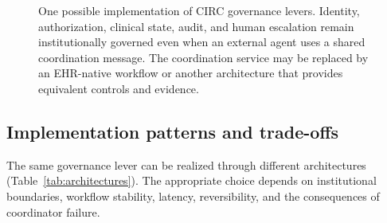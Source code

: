 \documentclass[10pt]{article}
\begin{document}
\begin{figure}[htbp]
\centering
\resizebox{0.98\linewidth}{!}{}
\caption{One possible implementation of CIRC governance levers. Identity, authorization, clinical
state, audit, and human escalation remain institutionally governed even when an external agent uses a
shared coordination message. The coordination service may be replaced by an EHR-native workflow or
another architecture that provides equivalent controls and evidence.}
\label{fig:architecture}
\end{figure}

\subsection{Implementation patterns and trade-offs}

The same governance lever can be realized through different architectures
(Table~\ref{tab:architectures}). The appropriate choice depends on institutional boundaries,
workflow stability, latency, reversibility, and the consequences of coordinator failure.
\end{document}
